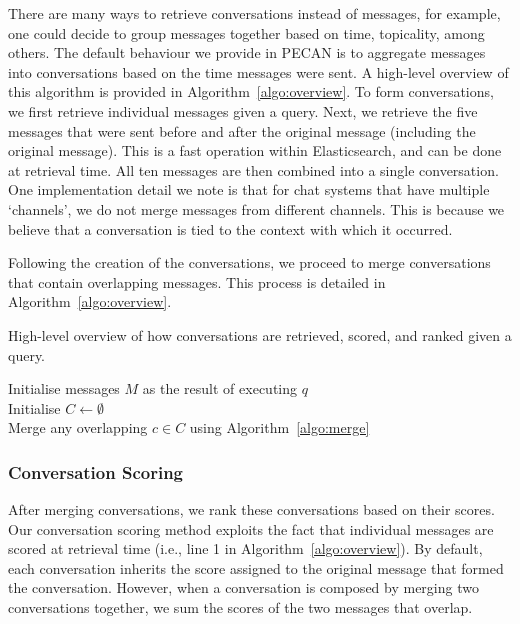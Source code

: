 There are many ways to retrieve conversations instead of messages, for example, one could decide to group messages together based on time, topicality, among others. The default behaviour we provide in PECAN is to aggregate messages into conversations based on the time messages were sent. A high-level overview of this algorithm is provided in Algorithm~\ref{algo:overview}. To form conversations, we first retrieve individual messages given a query. Next, we retrieve the five messages that were sent before and after the original message (including the original message). This is a fast operation within Elasticsearch, and can be done at retrieval time. All ten messages are then combined into a single conversation. One implementation detail we note is that for chat systems that have multiple `channels', we do not merge messages from different channels. This is because we believe that a conversation is tied to the context with which it occurred.

Following the creation of the conversations, we proceed to merge conversations that contain overlapping messages. This process is detailed in Algorithm~\ref{algo:overview}.



\begin{algorithm}
	\SetAlgoLined
	\caption{High-level overview of how conversations are retrieved, scored, and ranked given a query.}
	\label{algo:overview}
	Initialise messages $M$ as the result of executing $q$\\
	Initialise $C\gets\emptyset$\\ 
    Merge any overlapping $c\in C$ using Algorithm~\ref{algo:merge}\\
	\end{algorithm}
		
	
		
\subsubsection{Conversation Scoring}
\label{sec:conv-scoring}

After merging conversations, we rank these conversations based on their scores. Our conversation scoring method exploits the fact that individual messages are scored at retrieval time (i.e., line 1 in Algorithm~\ref{algo:overview}). By default, each conversation inherits the score assigned to the original message that formed the conversation. However, when a conversation is composed by merging two conversations together, we sum the scores of the two messages that overlap.


